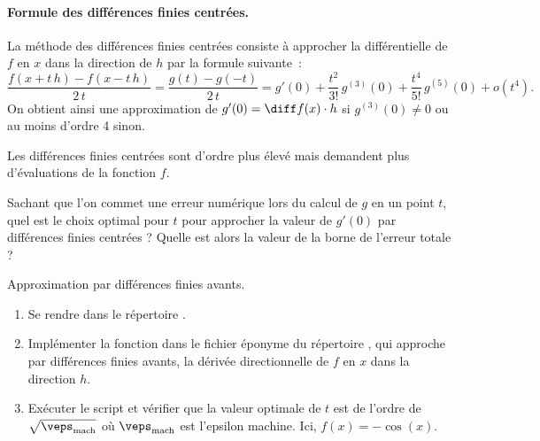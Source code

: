 \paragraph*{Formule des diff\'erences finies centr\'ees.} La m\'ethode des diff\'erences finies centr\'ees consiste \`a approcher la diff\'erentielle de 
$f$ en $x$ dans la direction de $h$ par la formule suivante~:
\begin{equation}
    \frac{f(x+t\,h)-f(x-t\,h)}{2\,t} = \frac{g(t)-g(-t)}{2\,t} = g'(0) + \frac{t^2}{3!}\, g^{(3)}(0) + \frac{t^4}{5!}\, g^{(5)}(0) + o(t^4).
    \label{eq:diffFinieAvant}
\end{equation}
On obtient ainsi une approximation de $g'(0) = \diff f(x) \cdot h$  si $g^{(3)}(0) \ne 0$ ou au moins d'ordre 4 sinon.

\begin{myremark}
    \anoter Les diff\'erences finies centr\'ees sont d'ordre plus \'elev\'e mais demandent plus d'\'evaluations de la fonction $f$.
\end{myremark}

\begin{myQuestion}
    \label{question:diff_finies}
    Sachant que l'on commet une erreur num\'erique lors du calcul de $g$ en un point $t$, quel est le choix optimal pour $t$ pour approcher la valeur de $g'(0)$ 
    par diff\'erences finies centr\'ees ? Quelle est alors la valeur de la borne de l'erreur totale ?
\end{myQuestion}

\begin{myExercice} Approximation par diff\'erences finies avants.
    \begin{enumerate}
        \item Se rendre dans le r\'epertoire .
        \item Impl\'ementer la fonction  dans le fichier \'eponyme du r\'epertoire ,
            qui approche par diff\'erences finies avants, la d\'eriv\'ee
            directionnelle de $f$ en $x$ dans la direction $h$.
        \item Ex\'ecuter le script  et v\'erifier que la valeur optimale de $t$ est de l'ordre de $\sqrt{\veps_\mathrm{mach}}$
            o\`u $\veps_\mathrm{mach}$ est l'epsilon machine. Ici, $f(x)=-\cos(x)$.
    \end{enumerate}
\end{myExercice}

